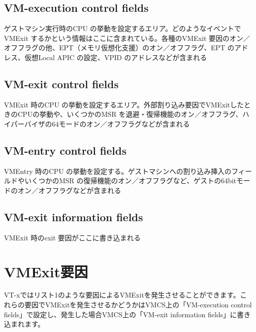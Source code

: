 \documentclass[a4j,12pt]{jarticle}
\begin{document}
\subsection*{VM-execution control fields}
ゲストマシン実行時のCPU の挙動を設定するエリア。どのようなイベントでVMExit するかという情報はここに含まれている。各種のVMExit 要因のオン／オフフラグの他、EPT（メモリ仮想化支援）のオン／オフフラグ、EPT のアドレス、仮想Local APIC の設定、VPID のアドレスなどが含まれる

\subsection*{VM-exit control fields}
VMExit 時のCPU の挙動を設定するエリア。外部割り込み要因でVMExitしたときのCPUの挙動や、いくつかのMSR を退避・復帰機能のオン／オフフラグ、ハイパーバイザの64モードのオン／オフフラグなどが含まれる

\subsection*{VM-entry control fields}
VMEntry 時のCPU の挙動を設定する。ゲストマシンへの割り込み挿入のフィールドやいくつかのMSR の復帰機能のオン／オフフラグなど、ゲストの64bitモードのオン／オフフラグなどが含まれる

\subsection*{VM-exit information fields}
VMExit 時のexit 要因がここに書き込まれる

\section{VMExit要因}
VT-xではリスト1のような要因によるVMExitを発生させることができます。これらの要因でVMExitを発生させるかどうかはVMCS上の「VM-execution control fields」で設定し、発生した場合VMCS上の「VM-exit information fields」に書き込まれます。
\end{document}
